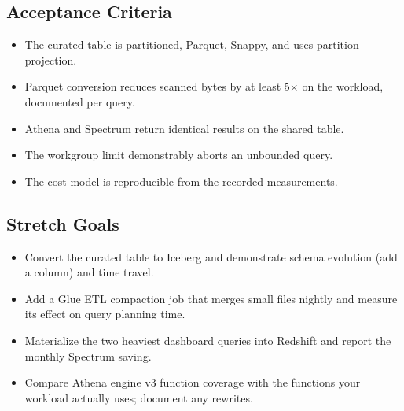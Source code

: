 \subsection*{Acceptance Criteria}
\begin{itemize}
    \item The curated table is partitioned, Parquet, Snappy, and uses partition projection.
    \item Parquet conversion reduces scanned bytes by at least 5$\times$ on the workload, documented per query.
    \item Athena and Spectrum return identical results on the shared table.
    \item The workgroup limit demonstrably aborts an unbounded query.
    \item The cost model is reproducible from the recorded measurements.
\end{itemize}

\subsection*{Stretch Goals}
\begin{itemize}
    \item Convert the curated table to Iceberg and demonstrate schema evolution (add a column) and time travel.
    \item Add a Glue ETL compaction job that merges small files nightly and measure its effect on query planning time.
    \item Materialize the two heaviest dashboard queries into Redshift and report the monthly Spectrum saving.
    \item Compare Athena engine v3 function coverage with the functions your workload actually uses; document any rewrites.
\end{itemize}
